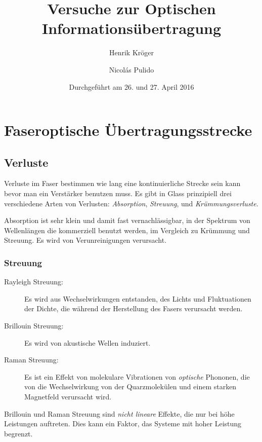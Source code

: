 \documentclass[a4paper]{article}
\title{Versuche zur Optischen Informationsübertragung}
\author{Henrik Kröger \and Nicolás Pulido}
\date{Durchgeführt am 26. und 27. April 2016}
\begin{document}
\maketitle


\tableofcontents

\newpage
\section{Faseroptische Übertragungsstrecke} 


\subsection{Verluste}
Verluste im Faser bestimmen wie lang eine kontinuierliche Strecke sein kann
bevor man ein Verstärker benutzen muss. Es gibt in Glass prinzipiell drei
verschiedene Arten von Verlusten: \emph{Absorption}, \emph{Streuung}, und
\emph{Krümmungsverluste}. 


Absorption ist sehr klein und damit fast vernachlässigbar, in der Spektrum von
Wellenlängen die kommerziell benutzt werden, im Vergleich zu Krümmung und
Streuung. Es wird von Verunreinigungen verursacht.

\subsubsection{Streuung}

\begin{description}
  \item[Rayleigh Streuung:] Es wird aus Wechselwirkungen entstanden, des Lichts
    und Fluktuationen der Dichte, die während der Herstellung des Fasers
    verursacht werden. 

  \item[Brillouin Streuung:] Es wird von akustische Wellen induziert. 

  \item[Raman Streuung:] Es ist ein Effekt von molekulare Vibrationen von
    \emph{optische} Phononen, die von die Wechselwirkung von der Quarzmolekülen
    und einem starken Magnetfeld verursacht wird.
\end{description}

Brillouin und Raman Streuung sind \emph{nicht lineare} Effekte, die nur bei höhe
Leistungen auftreten. Dies kann ein Faktor, das Systeme mit hoher Leistung
begrenzt. 
\end{document}
